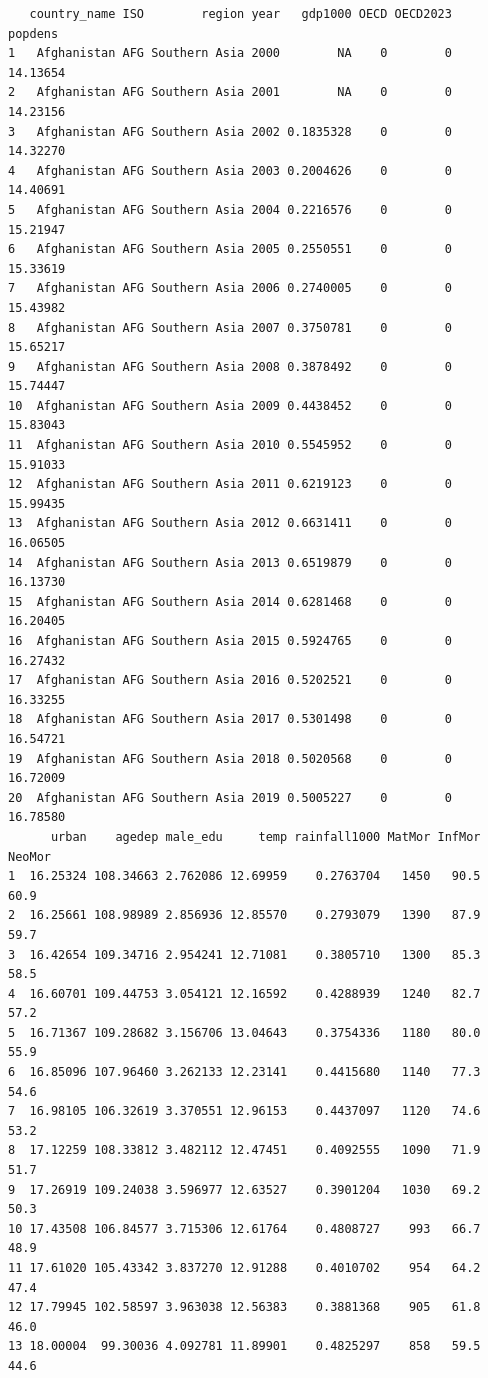 \documentclass[
  11pt,
  letterpaper,
  DIV=11,
  numbers=noendperiod]{scrartcl}
\begin{document}
\begin{verbatim}
   country_name ISO        region year   gdp1000 OECD OECD2023  popdens
1   Afghanistan AFG Southern Asia 2000        NA    0        0 14.13654
2   Afghanistan AFG Southern Asia 2001        NA    0        0 14.23156
3   Afghanistan AFG Southern Asia 2002 0.1835328    0        0 14.32270
4   Afghanistan AFG Southern Asia 2003 0.2004626    0        0 14.40691
5   Afghanistan AFG Southern Asia 2004 0.2216576    0        0 15.21947
6   Afghanistan AFG Southern Asia 2005 0.2550551    0        0 15.33619
7   Afghanistan AFG Southern Asia 2006 0.2740005    0        0 15.43982
8   Afghanistan AFG Southern Asia 2007 0.3750781    0        0 15.65217
9   Afghanistan AFG Southern Asia 2008 0.3878492    0        0 15.74447
10  Afghanistan AFG Southern Asia 2009 0.4438452    0        0 15.83043
11  Afghanistan AFG Southern Asia 2010 0.5545952    0        0 15.91033
12  Afghanistan AFG Southern Asia 2011 0.6219123    0        0 15.99435
13  Afghanistan AFG Southern Asia 2012 0.6631411    0        0 16.06505
14  Afghanistan AFG Southern Asia 2013 0.6519879    0        0 16.13730
15  Afghanistan AFG Southern Asia 2014 0.6281468    0        0 16.20405
16  Afghanistan AFG Southern Asia 2015 0.5924765    0        0 16.27432
17  Afghanistan AFG Southern Asia 2016 0.5202521    0        0 16.33255
18  Afghanistan AFG Southern Asia 2017 0.5301498    0        0 16.54721
19  Afghanistan AFG Southern Asia 2018 0.5020568    0        0 16.72009
20  Afghanistan AFG Southern Asia 2019 0.5005227    0        0 16.78580
      urban    agedep male_edu     temp rainfall1000 MatMor InfMor NeoMor
1  16.25324 108.34663 2.762086 12.69959    0.2763704   1450   90.5   60.9
2  16.25661 108.98989 2.856936 12.85570    0.2793079   1390   87.9   59.7
3  16.42654 109.34716 2.954241 12.71081    0.3805710   1300   85.3   58.5
4  16.60701 109.44753 3.054121 12.16592    0.4288939   1240   82.7   57.2
5  16.71367 109.28682 3.156706 13.04643    0.3754336   1180   80.0   55.9
6  16.85096 107.96460 3.262133 12.23141    0.4415680   1140   77.3   54.6
7  16.98105 106.32619 3.370551 12.96153    0.4437097   1120   74.6   53.2
8  17.12259 108.33812 3.482112 12.47451    0.4092555   1090   71.9   51.7
9  17.26919 109.24038 3.596977 12.63527    0.3901204   1030   69.2   50.3
10 17.43508 106.84577 3.715306 12.61764    0.4808727    993   66.7   48.9
11 17.61020 105.43342 3.837270 12.91288    0.4010702    954   64.2   47.4
12 17.79945 102.58597 3.963038 12.56383    0.3881368    905   61.8   46.0
13 18.00004  99.30036 4.092781 11.89901    0.4825297    858   59.5   44.6

\end{verbatim}
\end{document}
